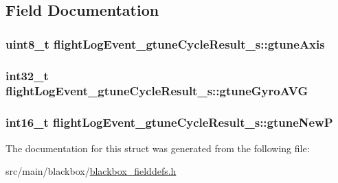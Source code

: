 \subsection{Field Documentation}
\hypertarget{structflightLogEvent__gtuneCycleResult__s_a458bf2f869cc0e8e6ba6ca20df069414}{
\subsubsection[{gtune\+Axis}]{\setlength{\rightskip}{0pt plus 5cm}uint8\+\_\+t flight\+Log\+Event\+\_\+gtune\+Cycle\+Result\+\_\+s\+::gtune\+Axis}}\label{structflightLogEvent__gtuneCycleResult__s_a458bf2f869cc0e8e6ba6ca20df069414}
\hypertarget{structflightLogEvent__gtuneCycleResult__s_ab2720b466adf125e5e79138f031f0c03}{
\subsubsection[{gtune\+Gyro\+A\+V\+G}]{\setlength{\rightskip}{0pt plus 5cm}int32\+\_\+t flight\+Log\+Event\+\_\+gtune\+Cycle\+Result\+\_\+s\+::gtune\+Gyro\+A\+V\+G}}\label{structflightLogEvent__gtuneCycleResult__s_ab2720b466adf125e5e79138f031f0c03}
\hypertarget{structflightLogEvent__gtuneCycleResult__s_a19df099da2506a45aa9ba82856d83259}{
\subsubsection[{gtune\+New\+P}]{\setlength{\rightskip}{0pt plus 5cm}int16\+\_\+t flight\+Log\+Event\+\_\+gtune\+Cycle\+Result\+\_\+s\+::gtune\+New\+P}}\label{structflightLogEvent__gtuneCycleResult__s_a19df099da2506a45aa9ba82856d83259}


The documentation for this struct was generated from the following file\+:\begin{DoxyCompactItemize}
\item 
src/main/blackbox/\hyperlink{blackbox__fielddefs_8h}{blackbox\+\_\+fielddefs.\+h}\end{DoxyCompactItemize}

